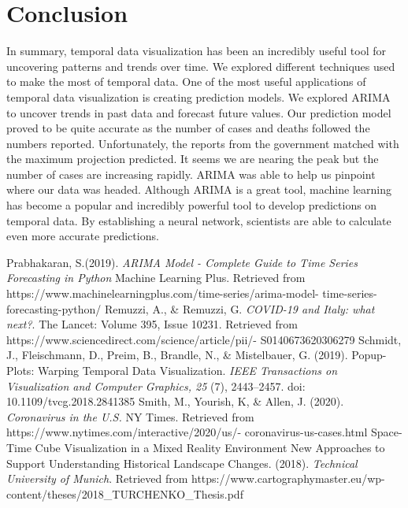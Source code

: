 \documentclass[twocolumn]{article}
\begin{document}
    \section{Conclusion}
            
    In summary, temporal data visualization has been an incredibly useful tool for uncovering patterns and trends over time. We explored different techniques used to make the most of temporal data. One of the most useful applications of temporal data visualization is creating prediction models. We explored ARIMA to uncover trends in past data and forecast future values. Our prediction model proved to be quite accurate as the number of cases and deaths followed the numbers reported. Unfortunately, the reports from the government matched with the maximum projection predicted. It seems we are nearing the peak but the number of cases are increasing rapidly. ARIMA was able to help us pinpoint where our data was headed. Although ARIMA is a great tool, machine learning has become a popular and incredibly powerful tool to develop predictions on temporal data. By establishing a neural network, scientists are able to calculate even more accurate predictions.
            
    \clearpage
        
    \begin{thebibliography}{9}
            Prabhakaran, S.(2019). \textit{ARIMA Model - Complete Guide to Time Series Forecasting in Python} Machine Learning Plus. Retrieved from {https://www.machinelearningplus.com/time-series/arima-model-
            time-series-forecasting-python/}
            Remuzzi, A., \& Remuzzi, G. \textit{COVID-19 and Italy: what next?}. The Lancet: Volume 395, Issue 10231. Retrieved from {https://www.sciencedirect.com/science/article/pii/-
            S0140673620306279}
            Schmidt, J., Fleischmann, D., Preim, B., Brandle, N., \& Mistelbauer, G. (2019). Popup-Plots: Warping Temporal Data Visualization. \textit{IEEE Transactions on Visualization and Computer Graphics, 25} (7), 2443–2457. doi: 10.1109/tvcg.2018.2841385
            Smith, M., Yourish, K, \& Allen, J. (2020). \textit{Coronavirus in the U.S.} NY Times. Retrieved from {https://www.nytimes.com/interactive/2020/us/-
            coronavirus-us-cases.html}
            Space-Time Cube Visualization in a Mixed Reality Environment New Approaches to Support Understanding Historical Landscape Changes. (2018). \textit{Technical University of Munich}. Retrieved from {https://www.cartographymaster.eu/wp-content/theses/2018\_TURCHENKO\_Thesis.pdf}
    \end{thebibliography}
\end{document}
